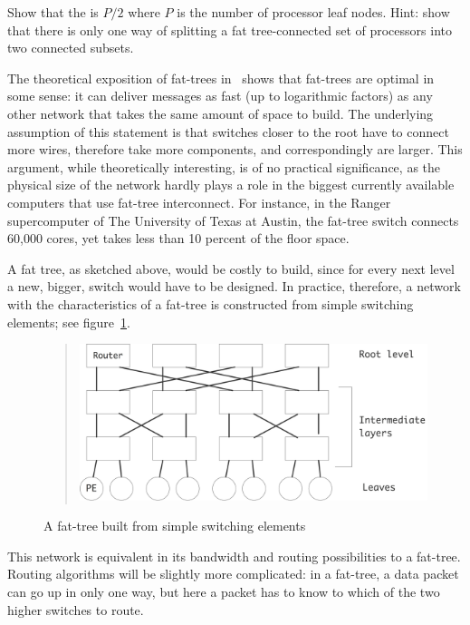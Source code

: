 \begin{exercise}
Show that the  is $P/2$
where $P$ is the number of processor leaf nodes. Hint: show that there
is only one way of splitting a fat tree-connected set of processors
into two connected subsets.
\end{exercise}

The theoretical exposition of fat-trees in~\cite{Leiserson:fattree}
shows that fat-trees are optimal in some sense: it can deliver
messages as fast (up to logarithmic factors) as any other network that
takes the same amount of space to build. The underlying assumption of
this statement is that switches closer to the root have to connect
more wires, therefore take more components, and correspondingly are
larger. 
%
This argument, while theoretically interesting, is of no practical
significance, as the physical size of the network hardly plays a role
in the biggest currently available computers that use fat-tree
interconnect. For instance, in the Ranger supercomputer of The
University of Texas at Austin, the fat-tree switch connects 60,000
cores, yet takes less than 10 percent of the floor space.

A fat tree, as sketched above, would be costly to build, since for
every next level a new, bigger, switch would have to be designed. In
practice, therefore, a network with the characteristics of a fat-tree
is constructed from simple switching elements; see
figure~\ref{fig:fattreeclos}.
\begin{figure}[ht]
  \begin{quote}
    \includegraphics[scale=.11]{graphics/fattree-clos}
  \end{quote}
  \caption{A fat-tree built from simple switching elements}
  \label{fig:fattreeclos}
\end{figure}
This network is equivalent in its bandwidth and routing possibilities
to a fat-tree. Routing algorithms will be slightly more complicated:
in a fat-tree, a data packet can go up in only one way, but here a
packet has to know to which of the two higher switches to route.

